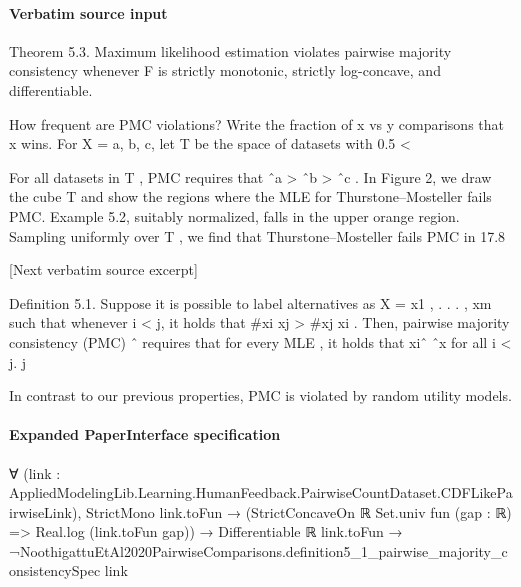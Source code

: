 \documentclass[10pt]{article}
\begin{document}
\paragraph{Verbatim source input}
\begin{ReviewVerbatim}
Theorem 5.3. Maximum likelihood estimation violates pairwise majority consistency whenever F is
strictly monotonic, strictly log-concave, and differentiable.

How frequent are PMC violations? Write %
the fraction of x vs y comparisons that x wins. For X = {a, b, c}, let T be the space of datasets with
                            0.5 < %

For all datasets in T , PMC requires that ˆa > ˆb > ˆc . In Figure 2, we draw the cube T and show
the regions where the MLE for Thurstone–Mosteller fails PMC. Example 5.2, suitably normalized,
falls in the upper orange region. Sampling uniformly over T , we find that Thurstone–Mosteller fails
PMC in 17.8%

[Next verbatim source excerpt]

Definition 5.1. Suppose it is possible to label alternatives as X = {x1 , . . . , xm } such that whenever
i < j, it holds that #{xi       xj } > #{xj        xi }. Then, pairwise majority consistency (PMC)
                              ˆ
requires that for every MLE , it holds that xiˆ       ˆx for all i < j.
                                                        j


In contrast to our previous properties, PMC is violated by random utility models.
\end{ReviewVerbatim}



\paragraph{Expanded PaperInterface specification}
\begin{ReviewVerbatim}
∀ (link : AppliedModelingLib.Learning.HumanFeedback.PairwiseCountDataset.CDFLikePairwiseLink),
  StrictMono link.toFun →
    (StrictConcaveOn ℝ Set.univ fun (gap : ℝ) => Real.log (link.toFun gap)) →
      Differentiable ℝ link.toFun →
        ¬NoothigattuEtAl2020PairwiseComparisons.definition5_1_pairwise_majority_consistencySpec link
\end{ReviewVerbatim}
\end{document}
